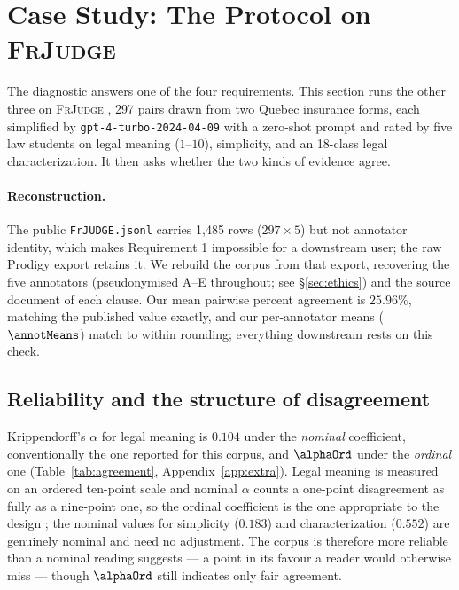 \documentclass[11pt]{article}
\begin{document}
\section{Case Study: The Protocol on \textsc{FrJudge}}
\label{sec:casestudy}

The diagnostic answers one of the four requirements. This section runs the other
three on \textsc{FrJudge} \citep{beauchemin2025judgebert}, 297 pairs drawn from
two Quebec insurance forms, each simplified by \texttt{gpt-4-turbo-2024-04-09}
with a zero-shot prompt and rated by five law students on legal meaning
($1$--$10$), simplicity, and an 18-class legal characterization. It then asks
whether the two kinds of evidence agree.

\paragraph{Reconstruction.}
The public \texttt{FrJUDGE.jsonl} carries 1{,}485 rows ($297\times5$) but not
annotator identity, which makes Requirement 1 impossible for a downstream user;
the raw Prodigy export retains it. We rebuild the corpus from that export,
recovering the five annotators (pseudonymised A--E throughout; see
\S\ref{sec:ethics}) and the source document of each clause. Our mean pairwise
percent agreement is $25.96\%$, matching the published value exactly, and our
per-annotator means ($\annotMeans$) match to within rounding; everything
downstream rests on this check.

\subsection{Reliability and the structure of disagreement}
\label{sec:agreement}

Krippendorff's $\alpha$ for legal meaning is $0.104$ under the \emph{nominal}
coefficient, conventionally the one reported for this corpus, and $\alphaOrd$
under the \emph{ordinal} one (Table~\ref{tab:agreement},
Appendix~\ref{app:extra}). Legal meaning is measured on an ordered ten-point
scale and nominal $\alpha$ counts a one-point disagreement as fully as a
nine-point one, so the ordinal coefficient is the one appropriate to the design
\citep{krippendorff2004content,artstein2008inter}; the nominal values for
simplicity ($0.183$) and characterization ($0.552$) are genuinely nominal and
need no adjustment. The corpus is therefore more reliable than a nominal reading
suggests --- a point in its favour a reader would otherwise miss --- though
$\alphaOrd$ still indicates only fair agreement.
\end{document}
